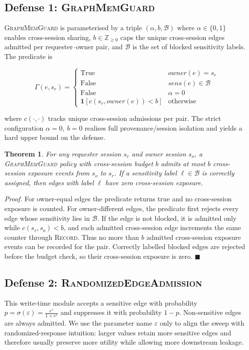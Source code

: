 \documentclass[journal,10pt,twocolumn]{IEEEtran}
\newtheorem{theorem}{Theorem}
\begin{document}
\subsection{Defense 1: \textsc{GraphMemGuard}}
\textsc{GraphMemGuard} is parameterised by a triple
$(\alpha, b, \mathcal{B})$ where $\alpha \in \{0,1\}$ enables
cross-session sharing, $b \in \mathbb{Z}_{\ge 0}$ caps the unique
cross-session edges admitted per requester--owner pair, and
$\mathcal{B}$ is the set of blocked sensitivity labels. The
predicate is

\begin{equation}
\label{eq:guard}
\Gamma(e, s_r) =
\begin{cases}
\mathrm{True} & \textit{owner}(e) = s_r \\
\mathrm{False} & \textit{sens}(e) \in \mathcal{B} \\
\mathrm{False} & \alpha = 0 \\
\mathbf{1}[c(s_r, \textit{owner}(e)) < b] & \text{otherwise}
\end{cases}
\end{equation}

where $c(\cdot,\cdot)$ tracks unique cross-session admissions per
pair. The strict configuration $\alpha=0,\ b=0$ realises full
provenance/session isolation and yields a hard upper bound on the
defense.

\begin{theorem}
\label{thm:guard-bound}
For any requester session $s_r$ and owner session $s_o$, a
\textsc{GraphMemGuard} policy with cross-session budget $b$ admits at
most $b$ cross-session exposure events from $s_o$ to $s_r$. If a
sensitivity label $\ell \in \mathcal{B}$ is correctly assigned, then
edges with label $\ell$ have zero cross-session exposure.
\end{theorem}
\emph{Proof.} For owner-equal edges the predicate returns true and no
cross-session exposure is counted. For owner-different edges, the
predicate first rejects every edge whose sensitivity lies in
$\mathcal{B}$. If the edge is not blocked, it is admitted only while
$c(s_r,s_o)<b$, and each admitted cross-session edge increments the
same counter through \textsc{Record}. Thus no more than $b$ admitted
cross-session exposure events can be recorded for the pair. Correctly
labelled blocked edges are rejected before the budget check, so their
cross-session exposure is zero. \hfill $\blacksquare$

\subsection{Defense 2: \textsc{RandomizedEdgeAdmission}}
This write-time module accepts a sensitive edge with probability
$p = \sigma(\varepsilon) = \frac{e^\varepsilon}{1 + e^\varepsilon}$
and suppresses it with probability $1 - p$. Non-sensitive edges are
always admitted. We use the parameter name $\varepsilon$ only to align
the sweep with randomized-response intuition: larger values retain
more sensitive edges and therefore usually preserve more utility while
allowing more downstream leakage.
\end{document}
